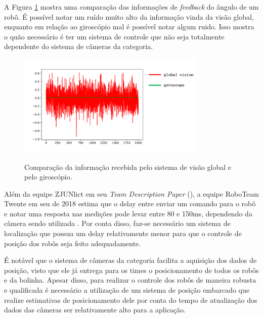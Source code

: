 \documentclass[acronym, symbols, table]{fei}
\begin{document}
			A Figura \ref{fig:comparison_cameras_gyroscope} mostra uma comparação das informações de \textit{feedback} do ângulo de um robô. É possível notar um ruído muito alto da informação vinda da visão global, enquanto em relação ao giroscópio mal é possível notar algum ruido. Isso mostra o quão necessário é ter um sistema de controle que não seja totalmente dependente do sistema de câmeras da categoria.
			
			\begin{figure}[!htb]
					\centering
					\caption{Comparação da informação recebida pelo sistema de visão global e pelo giroscópio.} 
					\includegraphics[width=0.8\textwidth]{Comparacao_cameras_giroscopio.png}
					\label{fig:comparison_cameras_gyroscope}
				\end{figure}
		
			Além da equipe ZJUNlict em seu \textit{Team Description Paper} (), a equipe RoboTeam Twente em seu  de 2018 estima que o delay entre enviar um comando para o robô e notar uma resposta nas medições pode levar entre 80 e 150ms, dependendo da câmera sendo utilizada \cite{tdptwente2018}. Por conta disso, faz-se necessário um sistema de localização que possua um delay relativamente menor para que o controle de posição dos robôs seja feito adequadamente.
			
			É notável que o sistema de câmeras da categoria  facilita a aquisição dos dados de posição, visto que ele já entrega para os times o posicionamento de todos os robôs e da bolinha. Apesar disso, para realizar o controle dos robôs de maneira robusta e qualificada é necessário a utilização de um sistema de posição embarcado que realize estimativas de posicionamento dele por conta do tempo de atualização dos dados das câmeras ser relativamente alto para a aplicação.

		
\end{document}
